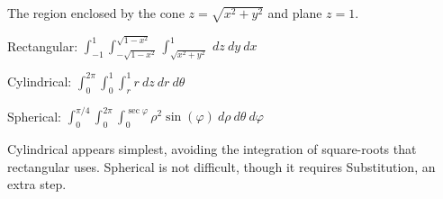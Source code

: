 {The region enclosed by the cone $z=\sqrt{x^2+y^2}$ and plane $z=1$.
}
{Rectangular: $\int_{-1}^{1}\int_{-\sqrt{1-x^2}}^{\sqrt{1-x^2}}\int_{\sqrt{x^2+y^2}}^{1}\ dz\ dy\ dx$

Cylindrical: $\int_0^{2\pi}\int_0^1\int_{r}^{1}r\ dz\ dr\ d\theta$

Spherical: $\int_0^{\pi/4}\int_0^{2\pi}\int_0^{\sec\varphi} \rho^2\sin(\varphi)\ d\rho\ d\theta\ d\varphi$

Cylindrical appears simplest, avoiding the integration of square-roots that rectangular uses. Spherical is not difficult, though it requires Substitution, an extra step.
}
